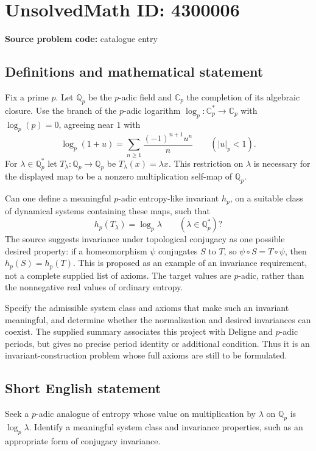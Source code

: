 \documentclass[11pt]{article}
\begin{document}
\section*{UnsolvedMath ID: 4300006}
\textbf{Source problem code:} catalogue entry
\subsection{Definitions and mathematical statement}
Fix a prime $p$. Let $\mathbb Q_p$ be the $p$-adic field and $\mathbb C_p$ the completion of its algebraic closure. Use the branch of the $p$-adic logarithm $\log_p:\mathbb C_p^*\to\mathbb C_p$ with $\log_p(p)=0$, agreeing near $1$ with
\[
\log_p(1+u)=\sum_{n\geq1}\frac{(-1)^{n+1}u^n}{n}\qquad(|u|_p<1).
\]
For $\lambda\in\mathbb Q_p^*$ let $T_\lambda:\mathbb Q_p\to\mathbb Q_p$ be $T_\lambda(x)=\lambda x$. This restriction on $\lambda$ is necessary for the displayed map to be a nonzero multiplication self-map of $\mathbb Q_p$.

Can one define a meaningful $p$-adic entropy-like invariant $h_p$, on a suitable class of dynamical systems containing these maps, such that
\[
h_p(T_\lambda)=\log_p\lambda\qquad(\lambda\in\mathbb Q_p^*)?
\]
The source suggests invariance under topological conjugacy as one possible desired property: if a homeomorphism $\psi$ conjugates $S$ to $T$, so $\psi\circ S=T\circ\psi$, then $h_p(S)=h_p(T)$. This is proposed as an example of an invariance requirement, not a complete supplied list of axioms. The target values are $p$-adic, rather than the nonnegative real values of ordinary entropy.

Specify the admissible system class and axioms that make such an invariant meaningful, and determine whether the normalization and desired invariances can coexist. The supplied summary associates this project with Deligne and $p$-adic periods, but gives no precise period identity or additional condition. Thus it is an invariant-construction problem whose full axioms are still to be formulated.
\subsection{Short English statement}
Seek a $p$-adic analogue of entropy whose value on multiplication by $\lambda$ on $\mathbb Q_p$ is $\log_p\lambda$. Identify a meaningful system class and invariance properties, such as an appropriate form of conjugacy invariance.
\end{document}
